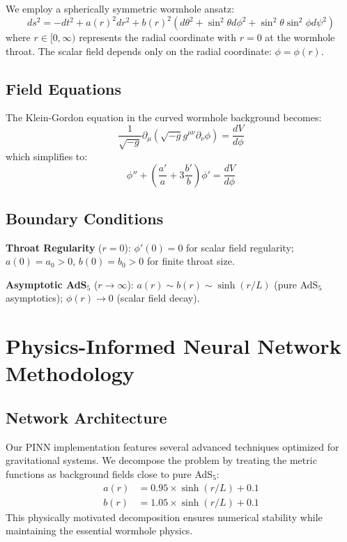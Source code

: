 \documentclass[aps,prd,twocolumn,showpacs,superscriptaddress]{revtex4-1}
\begin{document}
We employ a spherically symmetric wormhole ansatz:
%
\begin{equation}
ds^2 = -dt^2 + a(r)^2 dr^2 + b(r)^2(d\theta^2 + \sin^2\theta d\phi^2 + \sin^2\theta\sin^2\phi d\psi^2)
\end{equation}
%
where $r \in [0,\infty)$ represents the radial coordinate with $r = 0$ at the wormhole throat. The scalar field depends only on the radial coordinate: $\phi = \phi(r)$.

\subsection{Field Equations}

The Klein-Gordon equation in the curved wormhole background becomes:
%
\begin{equation}
\frac{1}{\sqrt{-g}}\partial_\mu(\sqrt{-g}g^{\mu\nu}\partial_\nu\phi) = \frac{dV}{d\phi}
\end{equation}
%
which simplifies to:
%
\begin{equation}
\phi'' + \left(\frac{a'}{a} + 3\frac{b'}{b}\right)\phi' = \frac{dV}{d\phi}
\label{eq:klein_gordon}
\end{equation}

\subsection{Boundary Conditions}

\textbf{Throat Regularity} ($r = 0$):
$\phi'(0) = 0$ for scalar field regularity; $a(0) = a_0 > 0$, $b(0) = b_0 > 0$ for finite throat size.

\textbf{Asymptotic AdS$_5$} ($r \to \infty$):
$a(r) \sim b(r) \sim \sinh(r/L)$ (pure AdS$_5$ asymptotics); $\phi(r) \to 0$ (scalar field decay).

\section{Physics-Informed Neural Network Methodology}

\subsection{Network Architecture}

Our PINN implementation features several advanced techniques optimized for gravitational systems. We decompose the problem by treating the metric functions as background fields close to pure AdS$_5$:
%
\begin{align}
a(r) &= 0.95 \times \sinh(r/L) + 0.1 \\
b(r) &= 1.05 \times \sinh(r/L) + 0.1
\end{align}
%
This physically motivated decomposition ensures numerical stability while maintaining the essential wormhole physics.
\end{document}
